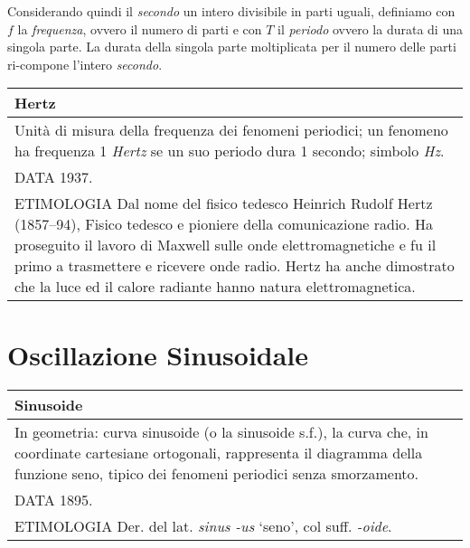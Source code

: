 Considerando quindi il \emph{secondo} un intero divisibile in parti uguali,
definiamo con $f$ la \emph{frequenza}, ovvero il numero di parti e con $T$
il \emph{periodo} ovvero la durata di una singola parte. La durata della
singola parte moltiplicata per il numero delle parti ri-compone l'intero \emph{secondo}.

\bigskip

		\begin{tabular}{L{.969\textwidth}}%
		\toprule
			\textbf{Hertz}\\
		\midrule
			Unità di misura della frequenza dei fenomeni periodici; un fenomeno ha
			frequenza 1 \emph{Hertz} se un suo periodo dura 1 secondo; simbolo
			\emph{Hz}.\\

			DATA 1937.\\

			ETIMOLOGIA Dal nome del fisico tedesco Heinrich Rudolf Hertz (1857–94),
			Fisico tedesco e pioniere della comunicazione radio. Ha proseguito il
			lavoro di Maxwell sulle onde elettromagnetiche e fu il primo a trasmettere
			e ricevere onde radio. Hertz ha anche dimostrato che la luce ed il calore
			radiante hanno natura elettromagnetica. \\
		\bottomrule
		\end{tabular}

\clearpage

\section{Oscillazione Sinusoidale}

		\begin{tabular}{L{.969\textwidth}}%
		\toprule
			\textbf{Sinusoide} \\
		\midrule
			In geometria: curva sinusoide (o la sinusoide s.f.), la curva che, in
			coordinate cartesiane ortogonali, rappresenta il diagramma della funzione
			seno, tipico dei fenomeni periodici senza smorzamento. \\

			DATA 1895.\\

			ETIMOLOGIA Der. del lat. \emph{sinus -us} ‘seno’, col suff. \emph{-oide}.\\
		\bottomrule
		\end{tabular}

